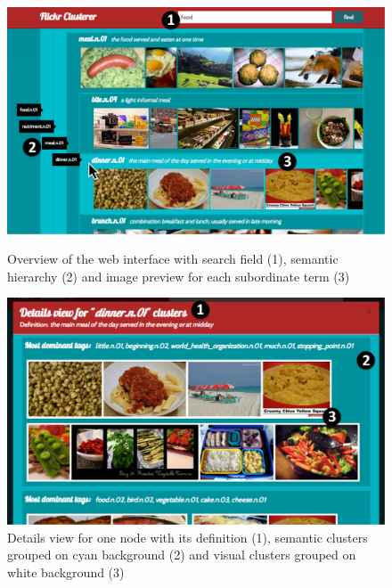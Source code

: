\begin{figure}[!htb]
    \includegraphics[width=\linewidth]{images/webfrontend-screenshot_1.pdf}
    \caption{Overview of the web interface with search field (1), semantic hierarchy (2) and image preview for each subordinate term (3)}\label{fig_webinerface_1}
  \endminipage\hfill
    \includegraphics[width=\linewidth]{images/webfrontend-screenshot_2.pdf}
    \caption{Details view for one node with its definition (1), semantic clusters grouped on cyan background (2) and visual clusters grouped on white background (3)}\label{fig_webinerface_2}
  \endminipage\hfill
\end{figure}

